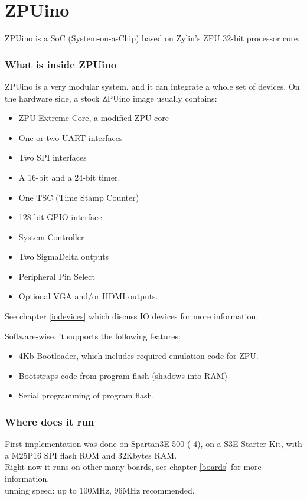 \chapter{ZPUino}
ZPUino is a SoC (System-on-a-Chip) based on Zylin's ZPU 32-bit processor core.

\subsection{What is inside ZPUino}

ZPUino is a very modular system, and it can integrate a whole set of devices.
On the hardware side, a stock ZPUino image usually contains:

\begin{itemize}
\item ZPU Extreme Core, a modified ZPU core
\item One or two UART interfaces
\item Two SPI interfaces
\item A 16-bit and a 24-bit timer.
\item One TSC (Time Stamp Counter)
\item 128-bit GPIO interface
\item System Controller
\item Two SigmaDelta outputs
\item Peripheral Pin Select
\item Optional VGA and/or HDMI outputs.
\end{itemize}

See chapter \ref{iodevices} which discuss IO devices for more information.

Software-wise, it supports the following features:

\begin{itemize}
\item 4Kb Bootloader, which includes required emulation code for ZPU.
\item Bootstraps code from program flash (shadows into RAM)
\item Serial programming of program flash.
\end{itemize}

\subsection{Where does it run}
First implementation was done on Spartan3E 500 (-4), on a S3E Starter Kit, with a M25P16 SPI flash ROM and 32Kbytes RAM.\\
Right now it runs on other many boards, see chapter \ref{boards} for more information. \\
unning speed: up to 100MHz, 96MHz recommended.

